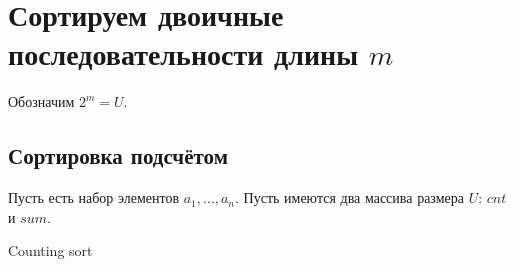 \section{Сортируем двоичные последовательности длины $m$}

Обозначим $2^m = U$.

\subsection{Сортировка подсчётом}
Пусть есть набор элементов $a_1, \ldots, a_n$. Пусть имеются два массива размера $U$: $cnt$ и $sum$.

\begin{algorithm}
    \caption{Counting sort}
    \begin{algorithmic}
        \EndFor
    \end{algorithmic}
\end{algorithm}